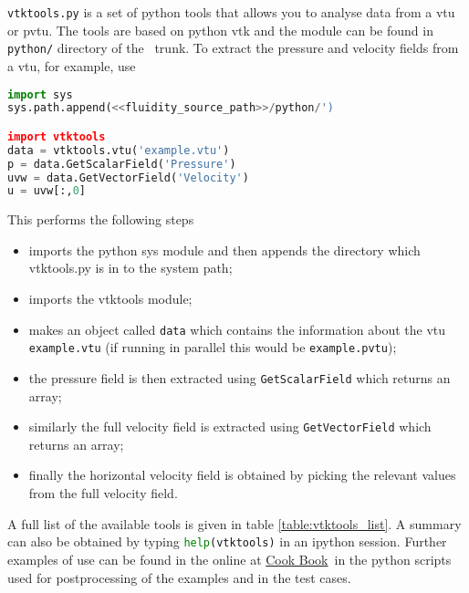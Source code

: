 \lstinline[language = bash]+vtktools.py+ is a set of python tools that allows you to analyse data from a vtu or pvtu. The tools are based on python vtk and the module can be found in \lstinline[language = bash]+python/+ directory of the \fluidity\ trunk. To extract the pressure and velocity fields from a vtu, for example, use
\begin{lstlisting}[language = Python]
import sys
sys.path.append(<<fluidity_source_path>>/python/')

import vtktools
data = vtktools.vtu('example.vtu')
p = data.GetScalarField('Pressure')
uvw = data.GetVectorField('Velocity')
u = uvw[:,0]
\end{lstlisting}  
This performs the following steps
\begin{itemize}
\item imports the python sys module and then appends the directory which vtktools.py is in to the system path;
\item imports the vtktools module;
\item makes an object called \lstinline[language=Python]+data+ which contains the information about the vtu \lstinline[language=Python]+example.vtu+ (if running in parallel this would be \lstinline[language=Python]+example.pvtu+);
\item the pressure field is then extracted using \lstinline[language=Python]+GetScalarField+ which returns an array;
\item similarly the full velocity field is extracted using \lstinline[language=Python]+GetVectorField+ which returns an array;
\item finally the horizontal velocity field is obtained by picking the relevant values from the full velocity field.
\end{itemize}
A full list of the available tools is given in table \ref{table:vtktools_list}. A summary can also be obtained by typing \lstinline[language=Python]+help(vtktools)+ in an ipython session.  Further examples of use can be found in the online at \href{http://amcg.ese.ic.ac.uk/index.php?title=Cook_Book}{Cook Book}\, in the python scripts used for postprocessing of the examples and in the test cases.
 

